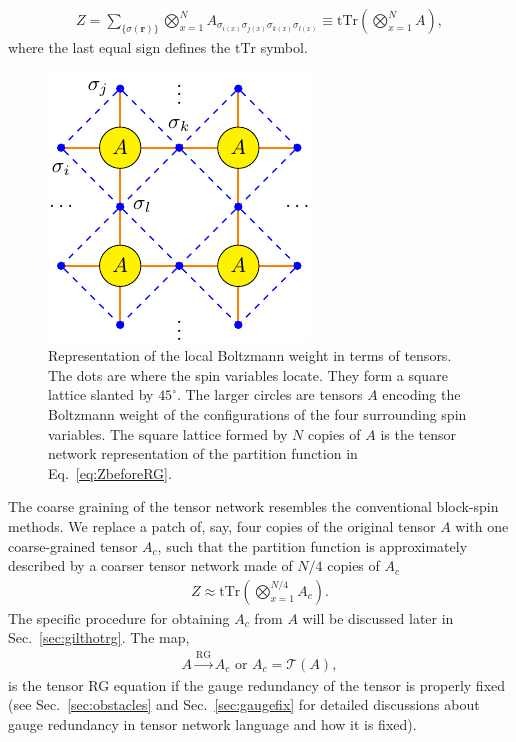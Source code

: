 \documentclass[aps,prr,reprint,superscriptaddress,nofootinbib,floatfix]{revtex4-2}
\newcommand{\tTr}{\mathrm{tTr}}
\begin{document}
%
\begin{align}\label{eq:ZbeforeRG}
    Z = \sum_{\{ \sigma(\mathbf{r}) \}}
    \bigotimes^{N}_{x=1}A_{\sigma_{i(x)} \sigma_{j(x)} \sigma_{k(x)} \sigma_{l(x)}}
    \equiv \tTr\left(\bigotimes_{x=1}^{N}A\right),
\end{align}
%
where the last equal sign defines the $\tTr$ symbol.
%
\begin{figure}[tb]
    \includegraphics[scale=0.8]{spin2tensor.pdf}
    \caption{\label{fig:spin2tensor}
        Representation of the local Boltzmann weight in terms of tensors.
        The dots are where the spin variables locate.
        They form a square lattice slanted by $45^\circ$.
        The larger circles are tensors $A$ encoding the Boltzmann weight of the configurations of the four surrounding spin variables.
    The square lattice formed by $N$ copies of $A$ is the tensor network representation of the partition function in Eq.~\eqref{eq:ZbeforeRG}.
}
\end{figure}


The coarse graining of the tensor network resembles the conventional block-spin methods.
We replace a patch of, say, four copies of the original tensor $A$ with one coarse-grained tensor $A_c$, such that the partition function is approximately described by a coarser tensor network made of $N/4$ copies of $A_c$
%
\begin{align}\label{eq:ZafterRG}
    Z \approx \tTr\left(\bigotimes_{x=1}^{N/4}A_c\right).
\end{align}
%
The specific procedure for obtaining $A_c$ from $A$ will be discussed later in Sec.~\ref{sec:gilthotrg}. The map, 
%
\begin{align}\label{def:tensorRGeq}
    A \xrightarrow{\text{RG}} A_c \text{ or } A_c = \mathcal{T}(A), 
\end{align}
is the tensor RG equation if the gauge redundancy of the tensor is properly fixed (see Sec.~\ref{sec:obstacles} and Sec.~\ref{sec:gaugefix} for detailed discussions about gauge redundancy in tensor network language and how it is fixed).
%
\end{document}
